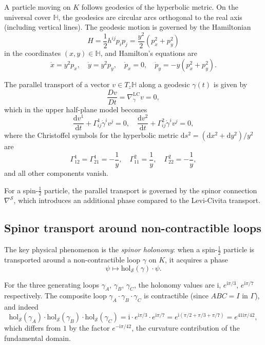 \documentclass[12pt,a4paper]{article}
\theoremstyle{definition}
\theoremstyle{remark}
\newcommand{\HH}{\mathbb{H}}
\newcommand{\hol}{\mathrm{hol}}
\newcommand{\LC}{\mathrm{LC}}
\newcommand{\cS}{\mathcal{S}}
\newcommand{\dd}{\mathrm{d}}
\newcommand{\ii}{\mathrm{i}}
\begin{document}
A particle moving on $K$ follows geodesics of the hyperbolic metric. On the universal cover $\HH$, the geodesics are circular arcs orthogonal to the real axis (including vertical lines). The geodesic motion is governed by the Hamiltonian
\begin{equation}
H = \frac{1}{2} h^{ij} p_i p_j = \frac{y^2}{2}(p_x^2 + p_y^2)
\end{equation}
in the coordinates $(x, y) \in \HH$, and Hamilton's equations are
\begin{equation}
\dot{x} = y^2 p_x, \quad \dot{y} = y^2 p_y, \quad \dot{p}_x = 0, \quad \dot{p}_y = -y(p_x^2 + p_y^2).
\end{equation}

The parallel transport of a vector $v \in T_z\HH$ along a geodesic $\gamma(t)$ is given by
\begin{equation}
\frac{Dv}{Dt} = \nabla^{\LC}_{\dot{\gamma}} v = 0,
\end{equation}
which in the upper half-plane model becomes
\begin{equation}
\frac{\dd v^1}{\dd t} + \Gamma^1_{ij} \dot{\gamma}^i v^j = 0, \quad \frac{\dd v^2}{\dd t} + \Gamma^2_{ij} \dot{\gamma}^i v^j = 0,
\end{equation}
where the Christoffel symbols for the hyperbolic metric $\dd s^2 = (\dd x^2 + \dd y^2)/y^2$ are
\begin{equation}
\Gamma^1_{12} = \Gamma^1_{21} = -\frac{1}{y}, \quad \Gamma^2_{11} = \frac{1}{y}, \quad \Gamma^2_{22} = -\frac{1}{y},
\end{equation}
and all other components vanish.

For a spin-$\frac{1}{2}$ particle, the parallel transport is governed by the spinor connection $\nabla^{\cS}$, which introduces an additional phase compared to the Levi-Civita transport.

\subsection{Spinor transport around non-contractible loops}

The key physical phenomenon is the \emph{spinor holonomy}: when a spin-$\frac{1}{2}$ particle is transported around a non-contractible loop $\gamma$ on $K$, it acquires a phase
\begin{equation}
\psi \mapsto \hol_{\cS}(\gamma) \cdot \psi.
\end{equation}

For the three generating loops $\gamma_A$, $\gamma_B$, $\gamma_C$, the holonomy values are $\ii$, $e^{\ii\pi/3}$, $e^{\ii\pi/7}$ respectively. The composite loop $\gamma_A \cdot \gamma_B \cdot \gamma_C$ is contractible (since $ABC = I$ in $\Gamma$), and indeed
\begin{equation}
\hol_{\cS}(\gamma_A) \cdot \hol_{\cS}(\gamma_B) \cdot \hol_{\cS}(\gamma_C) = \ii \cdot e^{\ii\pi/3} \cdot e^{\ii\pi/7} = e^{\ii(\pi/2 + \pi/3 + \pi/7)} = e^{41\ii\pi/42},
\end{equation}
which differs from $1$ by the factor $e^{-\ii\pi/42}$, the curvature contribution of the fundamental domain.
\end{document}
